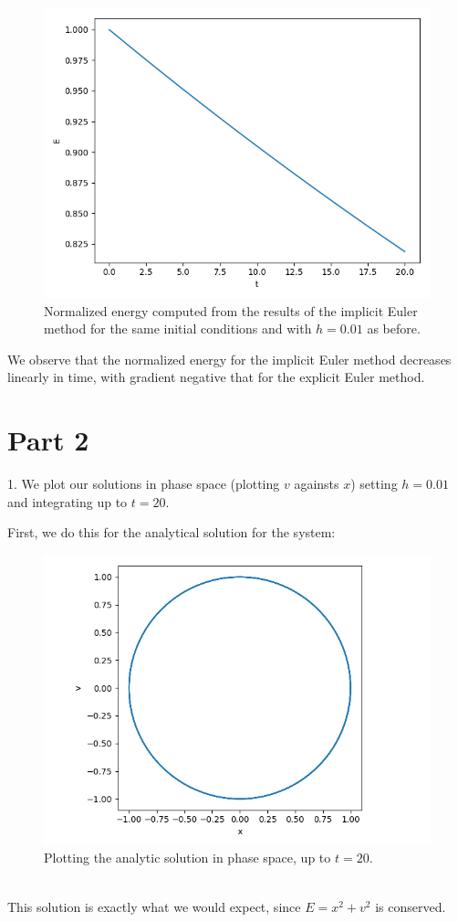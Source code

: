 \documentclass[11pt]{article}
\begin{document}
\begin{figure}[htp]
\centering
\includegraphics[scale=0.70]{implicit_euler_energy.png}
\caption{Normalized energy computed from the results of the implicit Euler method for the same initial conditions and with $h=0.01$ as before.}
\label{implicitenergy}
\end{figure}
We observe that the normalized energy for the implicit Euler method decreases linearly in time, with gradient negative that for the explicit Euler method.
\newpage

\section*{Part 2}
1. We plot our solutions in phase space (plotting $v$ againsts $x$) setting $h=0.01$ and integrating up to $t=20$.

First, we do this for the analytical solution for the system:
\begin{figure}[htp]
\centering
\includegraphics[scale=0.80]{analytic_phase.png}
\caption{Plotting the analytic solution in phase space, up to $t=20$.}
\label{analphase}
\end{figure}
\\
This solution is exactly what we would expect, since $E=x^2+v^2$ is conserved.
\newpage
\end{document}
